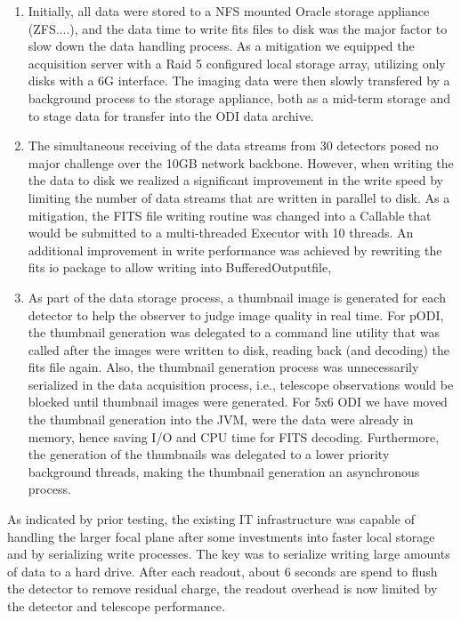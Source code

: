 \documentclass[]{spieman}
\begin{document}
\begin{enumerate} 
    
\item Initially, all data were stored to a NFS mounted Oracle storage appliance
(ZFS....), and the data time to write fits files to disk was the major factor to
slow down the data handling process. As a mitigation we equipped the acquisition
server with a Raid 5 configured local storage array, utilizing only disks with a
6G interface. The imaging data were then slowly transfered by a background
process to the storage appliance, both as a mid-term storage and to stage data
for transfer into the ODI data archive.

\item  The simultaneous receiving of the data streams from 30 detectors posed no
major challenge over the 10GB network backbone.  However, when writing the the
data to disk we realized a significant  improvement in the write speed by
limiting the number of data streams that are written in parallel to disk. As a
mitigation, the FITS file writing routine was changed into a Callable that would
be submitted to a multi-threaded Executor with 10 threads. An additional
improvement in write performance was achieved by rewriting the fits io package
to allow writing into BufferedOutputfile,

\item As part of the data storage process, a thumbnail image is generated for
each detector to help the observer to judge image quality in real time. For
pODI, the thumbnail generation was delegated to a command line utility that was
called after the images were written to disk, reading back (and decoding) the
fits file again. Also, the thumbnail generation process was unnecessarily
serialized in the data acquisition process, i.e., telescope observations would
be blocked until thumbnail images were generated.  For 5x6 ODI we have moved the
thumbnail generation into the JVM, were the data were already in memory, hence
saving I/O and CPU time for FITS decoding. Furthermore, the generation of the
thumbnails was delegated to a lower priority background threads, making the
thumbnail generation an asynchronous process.

    
\end{enumerate}

As indicated by prior testing, the existing IT infrastructure was capable of
handling the larger focal plane after some investments into faster local
storage and by serializing write processes. The key was to serialize writing
large amounts of data to a hard drive. After each readout, about 6 seconds
are spend to flush the detector to remove residual charge, the readout
overhead is now limited by the detector and telescope performance.
\end{document}
